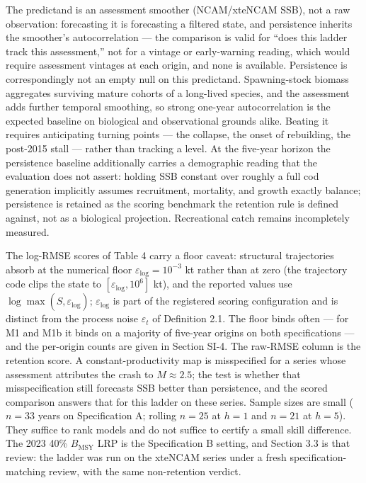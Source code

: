 \documentclass[11pt]{article}
\begin{document}
The predictand is an assessment smoother (NCAM/xteNCAM SSB), not a raw
observation: forecasting it is forecasting a filtered state, and
persistence inherits the smoother's autocorrelation --- the comparison
is valid for ``does this ladder track this assessment,'' not for a
vintage or early-warning reading, which would require assessment
vintages at each origin, and none is available. Persistence is
correspondingly not an empty null on this predictand. Spawning-stock
biomass aggregates surviving mature cohorts of a long-lived species, and
the assessment adds further temporal smoothing, so strong one-year
autocorrelation is the expected baseline on biological and observational
grounds alike. Beating it requires anticipating turning points --- the
collapse, the onset of rebuilding, the post-2015 stall --- rather than
tracking a level. At the five-year horizon
the persistence baseline additionally carries a demographic reading that
the evaluation does not assert: holding SSB constant over roughly a full
cod generation implicitly assumes recruitment, mortality, and growth
exactly balance; persistence is retained as the scoring benchmark the
retention rule is defined against, not as a biological projection.
Recreational catch remains incompletely measured.

The log-RMSE scores of Table 4 carry a floor caveat: structural
trajectories absorb at the numerical floor
\(\varepsilon_{\mathrm{log}} = 10^{-3}\) kt rather than at zero (the
trajectory code clips the state to
\([\varepsilon_{\mathrm{log}}, 10^{6}]\) kt), and the reported values
use \(\log\max(\hat S, \varepsilon_{\mathrm{log}})\);
\(\varepsilon_{\mathrm{log}}\) is part of the registered scoring
configuration and is distinct from the process noise \(\varepsilon_t\)
of Definition 2.1. The floor binds often --- for M1 and M1b it binds on a majority of
five-year origins on both specifications --- and the per-origin counts
are given in Section SI-4. The raw-RMSE column is the retention score. A constant-productivity map is
misspecified for a series whose assessment attributes the crash to
\(M \approx 2.5\); the test is whether that misspecification still
forecasts SSB better than persistence, and the scored comparison answers
that for this ladder on these series. Sample sizes are small
(\(n=33\) years on Specification A; rolling \(n=25\) at \(h=1\) and
\(n=21\) at \(h=5\)). They suffice to rank models and do not suffice to
certify a small skill difference. The 2023 40\% \(B_{\mathrm{MSY}}\) LRP
is the Specification B setting, and Section 3.3 is that review: the
ladder was run on the xteNCAM series under a fresh
specification-matching review, with the same non-retention verdict.
\end{document}
